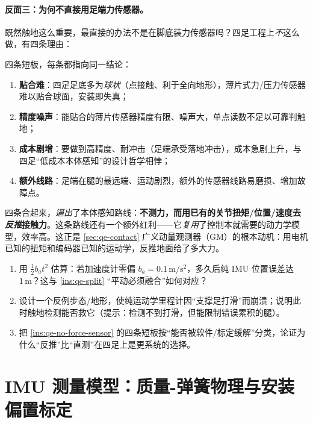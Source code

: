 \paragraph{反面三：为何不直接用足端力传感器。}
既然触地这么重要，最直接的办法不是在脚底装力传感器吗？四足工程上\emph{不}这么做，有四条理由：

\begin{insight}\label{ins:qe-no-force-sensor}
四条短板，每条都指向同一结论：
\begin{enumerate}
  \item \textbf{贴合难}：四足足底多为\emph{球状}（点接触、利于全向地形），薄片式力/压力传感器难以贴合球面，安装即失真；
  \item \textbf{精度噪声}：能贴合的薄片传感器精度有限、噪声大，单点读数不足以可靠判触地；
  \item \textbf{成本剧增}：要做到高精度、耐冲击（足端承受落地冲击），成本急剧上升，与四足“低成本本体感知”的设计哲学相悖；
  \item \textbf{额外线路}：足端在腿的最远端、运动剧烈，额外的传感器线路易磨损、增加故障点。
\end{enumerate}
四条合起来，\emph{逼出}了本体感知路线：\textbf{不测力，而用已有的关节扭矩/位置/速度去\emph{反推}接触力}。这条路线还有一个额外红利——它\emph{复用}了控制本就需要的动力学模型，效率高。这正是 \cref{sec:qe-contact} 广义动量观测器（GM）的根本动机：用电机已知的扭矩和编码器已知的运动学，反推地面给了多大力。
\end{insight}

\begin{practice}
\begin{enumerate}
  \item 用 $\tfrac12 b_a t^2$ 估算：若加速度计零偏 $b_a=0.1\,\mathrm{m/s^2}$，多久后纯 IMU 位置误差达 $1\,\mathrm{m}$？这与 \cref{ins:qe-split} “平动必须融合”如何对应？
  \item 设计一个反例步态/地形，使纯运动学里程计因“支撑足打滑”而崩溃；说明此时触地检测能否救它（提示：检测不到打滑，但能限制错误累积的腿）。
  \item 把 \cref{ins:qe-no-force-sensor} 的四条短板按“能否被软件/标定缓解”分类，论证为什么“反推”比“直测”在四足上是更系统的选择。
\end{enumerate}
\end{practice}

\section{IMU 测量模型：质量-弹簧物理与安装偏置标定}
\label{sec:qe-imu}

